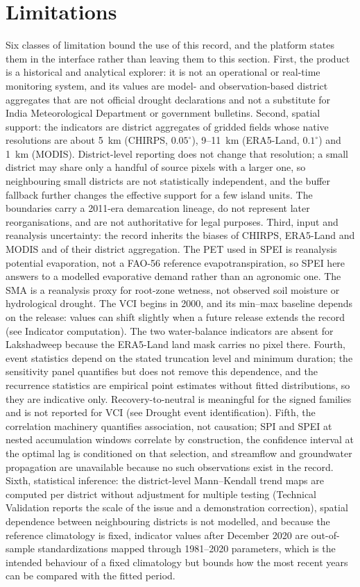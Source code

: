 \documentclass[10pt,a4paper]{article}
\begin{document}
\section*{Limitations}
Six classes of limitation bound the use of this record, and the platform states them in the interface rather than leaving them to this section. First, the product is a historical and analytical explorer: it is not an operational or real-time monitoring system, and its values are model- and observation-based district aggregates that are not official drought declarations and not a substitute for India Meteorological Department or government bulletins. Second, spatial support: the indicators are district aggregates of gridded fields whose native resolutions are about 5~km (CHIRPS, $0.05^\circ$), 9--11~km (ERA5-Land, $0.1^\circ$) and 1~km (MODIS). District-level reporting does not change that resolution; a small district may share only a handful of source pixels with a larger one, so neighbouring small districts are not statistically independent, and the buffer fallback further changes the effective support for a few island units. The boundaries carry a 2011-era demarcation lineage, do not represent later reorganisations, and are not authoritative for legal purposes. Third, input and reanalysis uncertainty: the record inherits the biases of CHIRPS, ERA5-Land and MODIS and of their district aggregation. The PET used in SPEI is reanalysis potential evaporation, not a FAO-56 reference evapotranspiration, so SPEI here answers to a modelled evaporative demand rather than an agronomic one. The SMA is a reanalysis proxy for root-zone wetness, not observed soil moisture or hydrological drought. The VCI begins in 2000, and its min--max baseline depends on the release: values can shift slightly when a future release extends the record (see Indicator computation). The two water-balance indicators are absent for Lakshadweep because the ERA5-Land land mask carries no pixel there. Fourth, event statistics depend on the stated truncation level and minimum duration; the sensitivity panel quantifies but does not remove this dependence, and the recurrence statistics are empirical point estimates without fitted distributions, so they are indicative only. Recovery-to-neutral is meaningful for the signed families and is not reported for VCI (see Drought event identification). Fifth, the correlation machinery quantifies association, not causation; SPI and SPEI at nested accumulation windows correlate by construction, the confidence interval at the optimal lag is conditioned on that selection, and streamflow and groundwater propagation are unavailable because no such observations exist in the record. Sixth, statistical inference: the district-level Mann--Kendall trend maps are computed per district without adjustment for multiple testing (Technical Validation reports the scale of the issue and a demonstration correction), spatial dependence between neighbouring districts is not modelled, and because the reference climatology is fixed, indicator values after December 2020 are out-of-sample standardizations mapped through 1981--2020 parameters, which is the intended behaviour of a fixed climatology but bounds how the most recent years can be compared with the fitted period.
\end{document}
